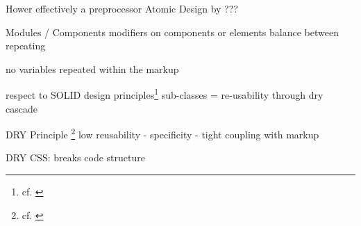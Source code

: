 Hower
effectively a preprocessor
Atomic Design by ??? 

Modules / Components
modifiers on components or elements
balance between repeating 





no variables
repeated within the markup

respect to SOLID design principles\footnote{cf. \cite{solidcss}}
sub-classes = re-usability through dry
cascade

DRY Principle \footnote{cf. \cite{pragmaticprogrammer}}
low reusability
- specificity
- tight coupling with markup

DRY CSS: breaks code structure
